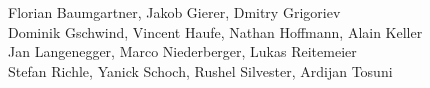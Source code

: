 %
%
%
Florian Baumgartner,	%
Jakob Gierer,		%
Dmitry Grigoriev	%
\\
Dominik Gschwind,	%
Vincent Haufe,		%
Nathan Hoffmann,	%
Alain Keller		%
\\
Jan Langenegger,	%
Marco Niederberger,	%
Lukas Reitemeier	%
\\
Stefan Richle,		%
Yanick Schoch,		%
Rushel Silvester,	%
Ardijan Tosuni		%

